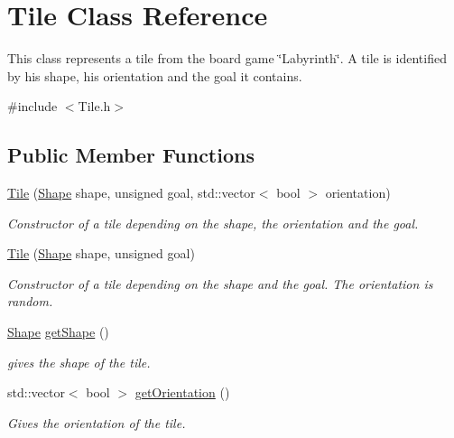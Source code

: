 \hypertarget{classTile}{}\section{Tile Class Reference}
\label{classTile}


This class represents a tile from the board game \char`\"{}\+Labyrinth\char`\"{}. A tile is identified by his shape, his orientation and the goal it contains.  




{\ttfamily \#include $<$Tile.\+h$>$}

\subsection*{Public Member Functions}
\begin{DoxyCompactItemize}
\item 
\mbox{\hyperlink{classTile_a42ec731c01debadf43b942f949b3c316}{Tile}} (\mbox{\hyperlink{Shape_8h_a55b506070847a13554f8b879c1bfb37c}{Shape}} shape, unsigned goal, std\+::vector$<$ bool $>$ orientation)
\begin{DoxyCompactList}\small\item\em Constructor of a tile depending on the shape, the orientation and the goal. \end{DoxyCompactList}\item 
\mbox{\hyperlink{classTile_a86201a49ab2ba5408691ed360d08e427}{Tile}} (\mbox{\hyperlink{Shape_8h_a55b506070847a13554f8b879c1bfb37c}{Shape}} shape, unsigned goal)
\begin{DoxyCompactList}\small\item\em Constructor of a tile depending on the shape and the goal. The orientation is random. \end{DoxyCompactList}\item 
\mbox{\hyperlink{Shape_8h_a55b506070847a13554f8b879c1bfb37c}{Shape}} \mbox{\hyperlink{classTile_a4eab532aa493c106b1847263f1aa1185}{get\+Shape}} ()
\begin{DoxyCompactList}\small\item\em gives the shape of the tile. \end{DoxyCompactList}\item 
std\+::vector$<$ bool $>$ \mbox{\hyperlink{classTile_a60a2686c593dfc0ccceef28395eaa566}{get\+Orientation}} ()
\begin{DoxyCompactList}\small\item\em Gives the orientation of the tile. \end{DoxyCompactList}\item 

\end{DoxyCompactItemize}
